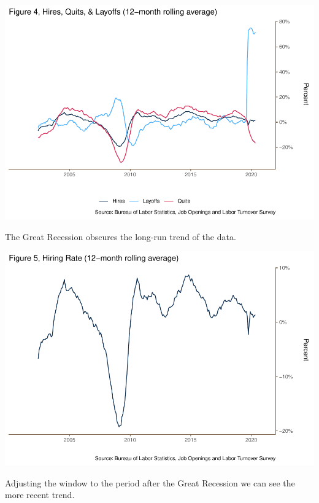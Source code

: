 \documentclass[
  11pt,
]{article}
\begin{document}
\begin{center}\includegraphics{JOLTS_files/figure-latex/unnamed-chunk-12-1} \end{center}

The Great Recession obscures the long-run trend of the data.

\begin{center}\includegraphics{JOLTS_files/figure-latex/unnamed-chunk-13-1} \end{center}

Adjusting the window to the period after the Great Recession we can see
the more recent trend.
\end{document}
